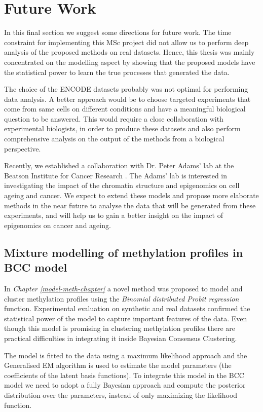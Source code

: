 \section{Future Work} \label{future-work-sect}
In this final section we suggest some directions for future work. The time constraint for implementing this MSc project did not allow us to perform deep analysis of the proposed methods on real datasets. Hence, this thesis was mainly concentrated on the modelling aspect by showing that the proposed models have the statistical power to learn the true processes that generated the data.

The choice of the ENCODE datasets probably was not optimal for performing data analysis. A better approach would be to choose targeted experiments that come from same cells on different conditions and have a meaningful biological question to be answered. This would require a close collaboration with experimental biologists, in order to produce these datasets and also perform comprehensive analysis on the output of the methods from a biological perspective. 

Recently, we established a collaboration with Dr. Peter Adams' lab at the Beatson Institute for Cancer Research \citep{Adams2015}. The Adams' lab is interested in investigating the impact of the chromatin structure and epigenomics on cell ageing and cancer. We expect to extend these models and propose more elaborate methods in the near future to analyse the data that will be generated from these experiments, and will help us to gain a better insight on the impact of epigenomics on cancer and ageing.     

\subsection{Mixture modelling of methylation profiles in BCC model} \label{conc-meth-prof-bcc-subsect}
In \emph{Chapter \ref{model-meth-chapter}} a novel method was proposed to model and cluster methylation profiles using the \emph{Binomial distributed Probit regression} function. Experimental evaluation on synthetic and real datasets confirmed the statistical power of the model to capture important features of the data. Even though this model is promising in clustering methylation profiles there are practical difficulties in integrating it inside Bayesian Consensus Clustering. 

The model is fitted to the data using a maximum likelihood approach and the Generalised EM algorithm is used to estimate the model parameters (\ie the coefficients of the latent basis functions). To integrate this model in the BCC model we need to adopt a fully Bayesian approach and compute the posterior distribution over the parameters, instead of only maximizing the likelihood function.


